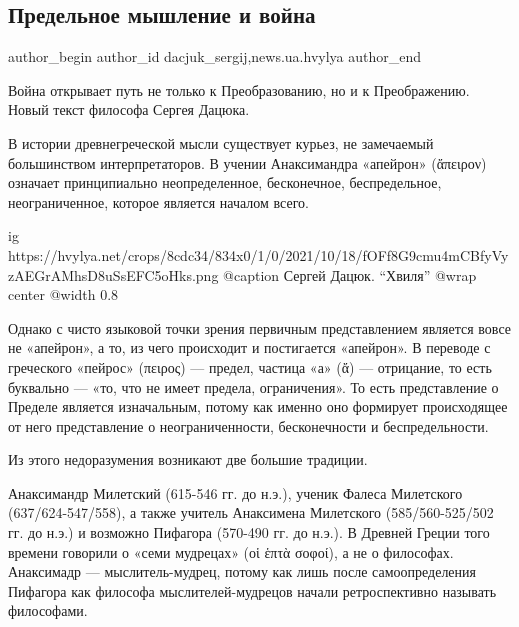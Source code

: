  
 
 
 
 
 
\subsection{Предельное мышление и война}
\label{sec:18_04_2022.stz.news.ua.hvylya.1.predelnoje_myshlenie_i_vojna}
 
\ifcmt
 author_begin
   author_id dacjuk_sergij,news.ua.hvylya
 author_end
\fi

\begin{zznagolos}
Война открывает путь не только к Преобразованию, но и к Преображению. Новый текст философа Сергея Дацюка.
\end{zznagolos}

В истории древнегреческой мысли существует курьез, не замечаемый большинством
интерпретаторов. В учении Анаксимандра «апейрон» (ἄπειρον) означает
принципиально неопределенное, бесконечное, беспредельное, неограниченное,
которое является началом всего.

\ifcmt
  ig https://hvylya.net/crops/8cdc34/834x0/1/0/2021/10/18/fOFf8G9cmu4mCBfyVyzAEGrAMhsD8uSsEFC5oHks.png
	@caption Сергей Дацюк. \enquote{Хвиля}
  @wrap center
  @width 0.8
\fi

Однако с чисто языковой точки зрения первичным представлением является вовсе не
«апейрон», а то, из чего происходит и постигается «апейрон». В переводе с
греческого «пейрос» (πειρος) — предел, частица «а» (ἄ) — отрицание, то есть
буквально — «то, что не имеет предела, ограничения». То есть представление о
Пределе является изначальным, потому как именно оно формирует происходящее от
него представление о неограниченности, бесконечности и беспредельности.

Из этого недоразумения возникают две большие традиции.

Анаксимандр Милетский (615-546 гг. до н.э.), ученик Фалеса Милетского
(637/624-547/558), а также учитель Анаксимена Милетского (585/560-525/502 гг.
до н.э.) и возможно Пифагора (570-490 гг. до н.э.). В Древней Греции того
времени говорили о «семи мудрецах» (οἱ ἑπτὰ σοφοί), а не о философах.
Анаксимадр — мыслитель-мудрец, потому как лишь после самоопределения Пифагора
как философа мыслителей-мудрецов начали ретроспективно называть философами.

